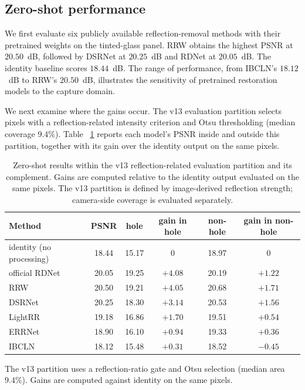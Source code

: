 \subsection{Zero-shot performance}
\label{sec:bench}

We first evaluate six publicly available reflection-removal
methods with their pretrained weights on the tinted-glass panel.
RRW obtains the highest PSNR at $20.50$~dB, followed by DSRNet
at $20.25$~dB and RDNet at $20.05$~dB. The identity
baseline scores $18.44$~dB. The range of performance, from
IBCLN's $18.12$~dB to RRW's $20.50$~dB, illustrates the
sensitivity of pretrained restoration models to the capture domain.

We next examine where the gains occur. The v13 evaluation partition
selects pixels with a reflection-related intensity criterion and
Otsu thresholding (median coverage $9.4\%$). Table~
\ref{tab:regiongain} reports each model's PSNR inside and
outside this partition, together with its gain over the
identity output on the same pixels.


\begin{table}[t]
\centering
\caption{Zero-shot results within the v13 reflection-related evaluation
partition and its complement. Gains are computed relative to the identity
output evaluated on the same pixels. The v13 partition is defined by image-derived reflection strength;
camera-side coverage is evaluated separately.}
\label{tab:regiongain}
\small
\setlength{\tabcolsep}{6pt}
\begin{tabular}{@{}lccccc@{}}
\toprule
Method & PSNR & hole & gain in hole & non-hole & gain in non-hole \\
\midrule
identity (no processing) & 18.44 & 15.17 & $0$ & 18.97 & $0$ \\
official RDNet~\cite{zhao2025rdnet} & 20.05 & 19.25 & $+4.08$ & 20.19 & $+1.22$ \\
RRW~\cite{zhu2024rrw} & 20.50 & 19.21 & $+4.05$ & 20.68 & $+1.71$ \\
DSRNet~\cite{hu2023dsrnet} & 20.25 & 18.30 & $+3.14$ & 20.53 & $+1.56$ \\
LightRR~\cite{lightrr2026} & 19.18 & 16.86 & $+1.70$ & 19.51 & $+0.54$ \\
ERRNet~\cite{wei2019errnet} & 18.90 & 16.10 & $+0.94$ & 19.33 & $+0.36$ \\
IBCLN~\cite{li2020ibcln} & 18.12 & 15.48 & $+0.31$ & 18.52 & $-0.45$ \\
\bottomrule
\end{tabular}\par
\vspace{2pt}
\noindent\footnotesize The v13 partition uses a reflection-ratio gate and
Otsu selection (median area $9.4\%$). Gains are computed against identity on the same pixels.
\end{table}


